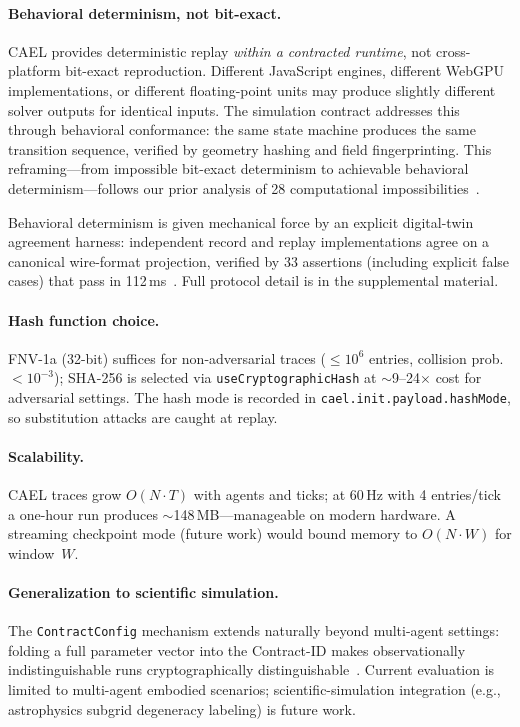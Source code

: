 \documentclass[sigconf,nonacm]{acmart}
\begin{document}
\paragraph{Behavioral determinism, not bit-exact.}
CAEL provides deterministic replay \emph{within a contracted runtime},
not cross-platform bit-exact reproduction. Different JavaScript engines,
different WebGPU implementations, or different floating-point units may
produce slightly different solver outputs for identical inputs. The
simulation contract addresses this through behavioral conformance:
the same state machine produces the same transition sequence, verified
by geometry hashing and field fingerprinting. This reframing---from
impossible bit-exact determinism to achievable behavioral
determinism---follows our prior analysis of 28 computational
impossibilities~\cite{impossibilities2026}.

Behavioral determinism is given mechanical force by an explicit digital-twin
agreement harness: independent record and replay implementations agree on a
canonical wire-format projection, verified by 33 assertions (including explicit
false cases) that pass in 112\,ms~\cite{paper-0c-twin-test-2026-05-11}. Full
protocol detail is in the supplemental material.

\paragraph{Hash function choice.}
FNV-1a (32-bit) suffices for non-adversarial traces ($\leq 10^6$ entries, collision
prob.\ $< 10^{-3}$); SHA-256 is selected via \texttt{useCryptographicHash} at
$\sim$9--24$\times$ cost for adversarial settings. The hash mode is recorded in
\texttt{cael.init.payload.hashMode}, so substitution attacks are caught at replay.

\paragraph{Scalability.}
CAEL traces grow $O(N \cdot T)$ with agents and ticks; at 60\,Hz with 4 entries/tick
a one-hour run produces $\sim$148\,MB---manageable on modern hardware. A streaming
checkpoint mode (future work) would bound memory to $O(N \cdot W)$ for window~$W$.

\paragraph{Generalization to scientific simulation.}
The \texttt{ContractConfig} mechanism extends naturally beyond multi-agent settings:
folding a full parameter vector into the Contract-ID makes observationally
indistinguishable runs cryptographically distinguishable~\cite{architects2026,sbi2022}.
Current evaluation is limited to multi-agent embodied scenarios; scientific-simulation
integration (e.g., astrophysics subgrid degeneracy labeling) is future work.
\end{document}
